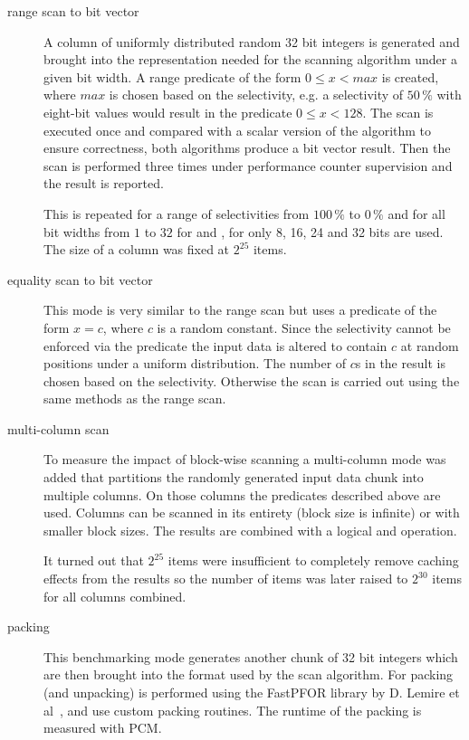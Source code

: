 \begin{description}
\item[range scan to bit vector]
  A column of uniformly distributed random 32 bit integers is generated and
  brought into the representation needed for the scanning algorithm under a
  given bit width. A range predicate of the form $0 \le x < max$ is created,
  where $max$ is chosen based on the selectivity, e.g.  a selectivity of
  $50\,\%$ with eight-bit values would result in the predicate $0 \le x < 128$.
  The scan is executed once and compared with a scalar version of the algorithm
  to ensure correctness, both algorithms produce a bit vector result. Then the
  scan is performed three times under performance counter supervision and the
  result is reported.

  This is repeated for a range of selectivities from $100\,\%$ to $0\,\%$ and
  for all bit widths from $1$ to $32$ for \simdscan{} and \bwv{}, for \bs{} only
  8, 16, 24 and 32 bits are used. The size of a column was fixed at $2^{25}$
  items.

\item[equality scan to bit vector]
  This mode is very similar to the range scan but uses a predicate of the form
  $x = c$, where $c$ is a random constant. Since the selectivity cannot be
  enforced via the predicate the input data is altered to contain $c$ at random
  positions under a uniform distribution. The number of $c$s in the result is
  chosen based on the selectivity. Otherwise the scan is carried out using the
  same methods as the range scan.

\item[multi-column scan]
  To measure the impact of block-wise scanning a multi-column mode was added
  that partitions the randomly generated input data chunk into multiple
  columns. On those columns the predicates described above are used. Columns
  can be scanned in its entirety (block size is infinite) or with smaller
  block sizes. The results are combined with a logical and operation.

  It turned out that $2^{25}$ items were insufficient to completely remove
  caching effects from the results so the number of items was later raised to
  $2^{30}$ items for all columns combined.

\item[packing]
  This benchmarking mode generates another chunk of 32 bit integers which are
  then brought into the format used by the scan algorithm. For \simdscan{}
  packing (and unpacking) is performed using the FastPFOR library by D. Lemire
  et al~\cite{fastpfor}, \bwv{} and \bs{} use
  custom packing routines. The runtime of the packing is measured with PCM.


\end{description}
